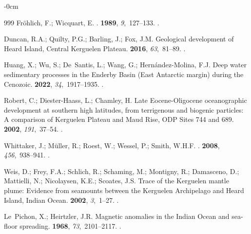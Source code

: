 \documentclass[geomatics,article,accept,pdftex,moreauthors]{Definitions/mdpi}
\begin{document}
\begin{adjustwidth}{-\extralength}{0cm}
\begin{thebibliography}{999}
Fröhlich, F.; Wicquart, E.
.
 {\bf 1989}, {\em 9},~127--133.
.

Duncan, R.A.; Quilty, P.G.; Barling, J.; Fox, J.M.
\newblock Geological development of Heard Island, Central Kerguelen Plateau.
 {\bf 2016}, {\em
  63},~81--89.
.

Huang, X.; Wu, S.; De~Santis, L.; Wang, G.; Hernández-Molina, F.J.
\newblock Deep water sedimentary processes in the Enderby Basin (East Antarctic
  margin) during the Cenozoic.
 {\bf 2022}, {\em 34},~1917--1935.
.

Robert, C.; Diester-Haass, L.; Chamley, H.
\newblock Late Eocene-Oligocene oceanographic development at southern high
  latitudes, from terrigenous and biogenic particles: A comparison of Kerguelen
  Plateau and Maud Rise, ODP Sites 744 and 689.
 {\bf 2002}, {\em 191},~37--54.
.

Whittaker, J.; Müller, R.; Roest, W.; Wessel, P.; Smith, W.H.F.
.
 {\bf 2008}, {\em 456},~938--941.
.

Weis, D.; Frey, F.A.; Schlich, R.; Schaming, M.; Montigny, R.; Damasceno, D.;
  Mattielli, N.; Nicolaysen, K.E.; Scoates, J.S.
\newblock Trace of the Kerguelen mantle plume: Evidence from seamounts between
  the Kerguelen Archipelago and Heard Island, Indian Ocean.
 {\bf 2002}, {\em
  3},~1--27.
.

Le~Pichon, X.; Heirtzler, J.R.
\newblock Magnetic anomalies in the Indian Ocean and sea-floor spreading.
 {\bf 1968}, {\em
  73},~2101--2117.
.


\end{thebibliography}
\end{adjustwidth}
\end{document}
